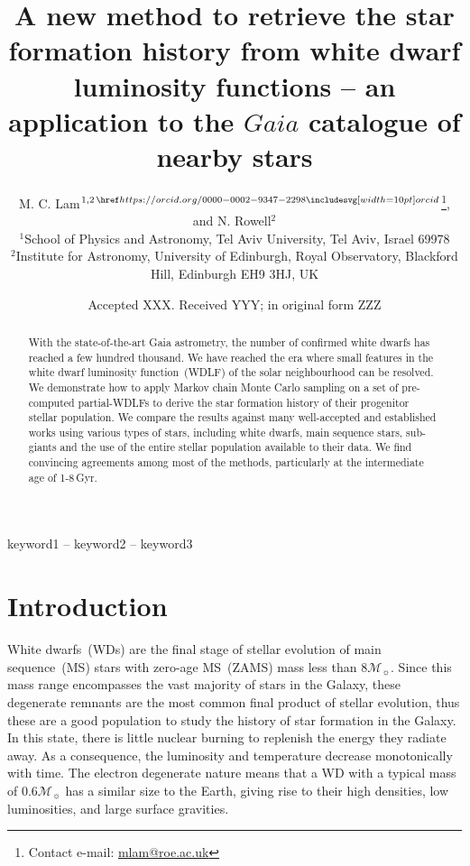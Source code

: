 \documentclass[fleqn,usenatbib]{mnras}
\title[Galactic SFH from Gaia GCNS WDLF]{A new method to retrieve the star formation history from white dwarf luminosity functions -- an application to the $Gaia$ catalogue of nearby stars}
\author[M. C. Lam et al.]{
M. C. Lam$^{1, 2\,\orcid{0000-0002-9347-2298}}$\thanks{Contact e-mail: \href{mailto:mlam@roe.ac.uk}{mlam@roe.ac.uk}},
and N. Rowell$^{2}$
\\
$^{1}$School of Physics and Astronomy, Tel Aviv University, Tel Aviv, Israel 69978\\
$^{2}$Institute for Astronomy, University of Edinburgh, Royal Observatory, Blackford Hill, Edinburgh EH9 3HJ, UK
}
\date{Accepted XXX. Received YYY; in original form ZZZ}
\newcommand{\msun}{\mathcal{M}_{\sun}}
\begin{document}
\label{firstpage}
\pagerange{\pageref{firstpage}--\pageref{lastpage}}
\maketitle


\begin{abstract}
With the state-of-the-art Gaia astrometry, the number of confirmed white dwarfs
has reached a few hundred thousand. We have reached the era where small features
in the white dwarf luminosity function~(WDLF) of the solar neighbourhood can be
resolved. We demonstrate how to apply Markov chain Monte Carlo sampling on a
set of pre-computed partial-WDLFs to derive the star formation history of their
progenitor stellar population. We compare the results against many well-accepted
and established works using various types of stars, including white dwarfs,
main sequence stars, sub-giants and the use of the entire stellar population
available to their data. We find convincing agreements among most of the
methods, particularly at the intermediate age of 1-8\,Gyr.

\end{abstract}

\begin{keywords}
keyword1 -- keyword2 -- keyword3
\end{keywords}



\section{Introduction}
White dwarfs~(WDs) are the final stage of stellar evolution of main
sequence~(MS) stars with zero-age MS~(ZAMS) mass less than $8\msun$. Since this
mass range encompasses the vast majority of stars in the Galaxy, these
degenerate remnants are the most common final product of stellar evolution,
thus these are a good population to study the history of star formation in the
Galaxy. In this state, there is little nuclear burning to replenish the energy
they radiate away. As a consequence, the luminosity and temperature decrease
monotonically with time. The electron degenerate nature means that a WD with a
typical mass of $0.6\mathcal{M}_{\sun}$ has a similar size to the Earth, giving
rise to their high densities, low luminosities, and large surface gravities.
\end{document}
